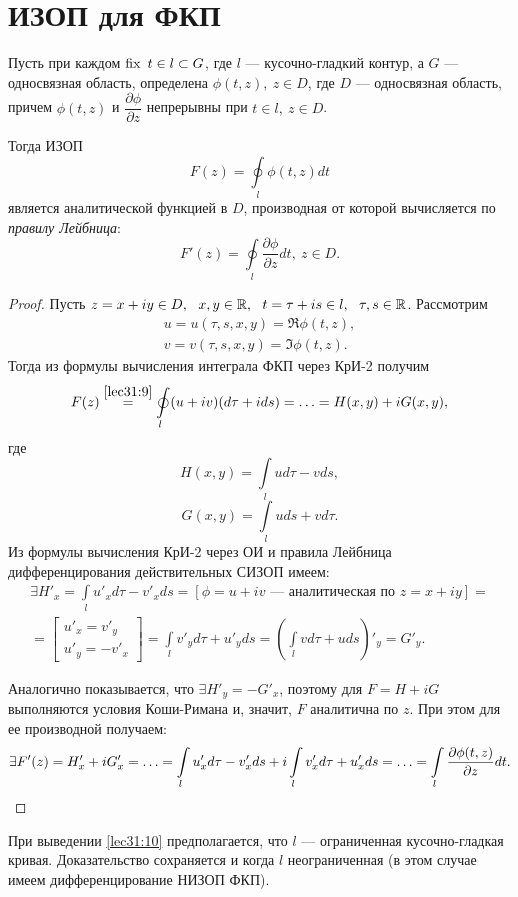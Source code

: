 \documentclass[../../main.tex]{subfiles}
\begin{document}
\section{ИЗОП для ФКП}
\begin{thm}
    Пусть при каждом $\operatorname{fix} \ t \in l \subset G$, где $l$ --- кусочно-гладкий
    контур, а $G$ --- односвязная область, определена $ \phi(t, z), \
    z \in D $, где $D$ --- односвязная область, причем
    $\phi(t, z)$ и $\dfrac{\partial \phi}{\partial z}$ непрерывны при
    $t \in l, \ z \in D$.
    
    Тогда ИЗОП
    \begin{equation}
        \label{lec31:9}
        F(z) = \oint\limits_{l} \phi(t, z) dt
    \end{equation}
    является аналитической функцией в $D$, производная от которой вычисляется
    по \emph{правилу Лейбница}:
    \begin{equation}
        \label{lec31:10}
        F'(z) = \oint\limits_{l} \dfrac{\partial \phi}{\partial z} dt,
        \ z \in D.
    \end{equation}
\end{thm}
\begin{proof}
    Пусть $z = x + i y \in D, \ \ x, y \in \R, \ \ t = \tau + i s \in l,
    \ \ \tau, s \in \R$. Рассмотрим \[ \begin{gathered}
    u = u(\tau, s, x, y) = \Re \phi(t, z), \\
    v = v(\tau, s, x, y) = \Im \phi(t, z).
    \end{gathered} \]
    Тогда из формулы вычисления интеграла ФКП через КрИ-2 получим
    \[ F(z) \stackrel{\eqref{lec31:9}}{=} \oint\limits_{l} (u + i v)
    (d \tau + i d s) = \ldots = H(x, y) + i G(x, y),\]
    где
    \[ H(x, y) = \int\limits_{l} u d \tau - v d s, \]
    \[ G(x, y) = \int\limits_{l} u d s + v d \tau. \]
    Из формулы вычисления КрИ-2 через ОИ и правила Лейбница
    дифференцирования действительных СИЗОП имеем:
    \[ \begin{gathered} 
        \exists H'_x = \int\limits_{l} u'_x d \tau - v'_x d s =
        [ \phi = u + i v \text{~--- аналитическая по } z = x + i y ]
        = \\ =
        \left[\begin{gathered}
            u'_x = v'_y \\
            u'_y = - v'_x
        \end{gathered}\right] =
        \int\limits_{l} v'_y d \tau + u'_y d s =
        \left(\int\limits_{l} v d \tau + u d s\right)'_y = G'_y.
    \end{gathered} \]

    Аналогично показывается, что $\exists H'_y = -G'_x$, поэтому для
    $ F = H + i G $
    выполняются условия Коши-Римана и, значит, $F$ аналитична по $z$.
    При этом для ее производной получаем:
    \[\begin{gathered}
        \exists F'(z) = H'_x + i G'_x = \ldots =
        \int\limits_{l} u'_x d \tau - v'_x d s + 
        i \int\limits_{l} v'_x d \tau + u'_x d s = \ldots =
        \int\limits_{l} \dfrac{\partial \phi (t, z)}{\partial z} dt. \qedhere
    \end{gathered}\] 
\end{proof}
\begin{rem}
    При выведении \eqref{lec31:10} предполагается, что $l$ ---
    ограниченная кусочно-гладкая кривая. Доказательство сохраняется
    и когда $l$ неограниченная (в этом случае имеем дифференцирование НИЗОП
    ФКП).
\end{rem}
\end{document}
